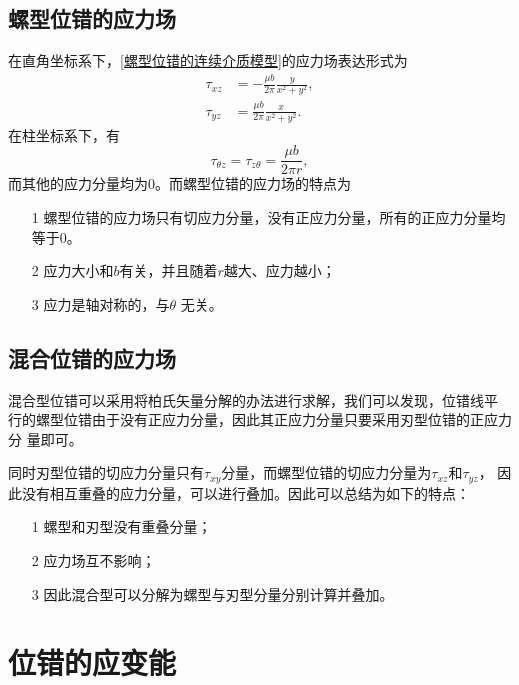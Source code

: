             \subsection{螺型位错的应力场}
                在直角坐标系下，\autoref{螺型位错的连续介质模型}的应力场表达形式为
                \begin{align} 
                    \tau_{x z} &=-\frac{\mu b}{2 \pi} \frac{y}{x^{2}+y^{2}}, \\
                    \tau_{y z} &=\frac{\mu b}{2 \pi} \frac{x}{x^{2}+y^{2}}. 
                \end{align}
                在柱坐标系下，有
                \begin{equation}
                    \tau_{\theta z}=\tau_{z\theta}=\frac{\mu b}{2\pi r},
                \end{equation}
                而其他的应力分量均为0。而螺型位错的应力场的特点为
                \begin{itemize}
                    \item[1]  螺型位错的应力场只有切应力分量，没有正应力分量，所有的正应力分量均等于0。
                    \item[2] 应力大小和$b$有关，并且随着$r$越大、应力越小；
                    \item[3] 应力是轴对称的，与$θ$ 无关。
                \end{itemize}
            \subsection{混合位错的应力场}
                混合型位错可以采用将柏氏矢量分解的办法进行求解，我们可以发现，位错线平
                行的螺型位错由于没有正应力分量，因此其正应力分量只要采用刃型位错的正应力分
                量即可。
                
                同时刃型位错的切应力分量只有$\tau_{xy}$分量，而螺型位错的切应力分量为$\tau_{xz}$和$\tau_{yz}$，
                因此没有相互重叠的应力分量，可以进行叠加。因此可以总结为如下的特点：
                \begin{itemize}
                    \item[1] 螺型和刃型没有重叠分量；
                    \item[2] 应力场互不影响；
                    \item[3] 因此混合型可以分解为螺型与刃型分量分别计算并叠加。
                \end{itemize}
        \section{位错的应变能}
